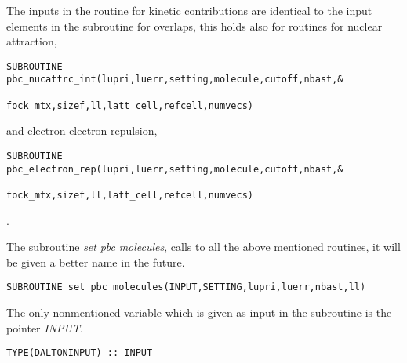\documentclass[12pt,a4paper,english]{article}
\begin{document}
The inputs in the routine for kinetic contributions are identical to the input elements in the subroutine for overlaps, this holds also for routines for nuclear attraction,
\begin{verbatim}
SUBROUTINE pbc_nucattrc_int(lupri,luerr,setting,molecule,cutoff,nbast,&
                            fock_mtx,sizef,ll,latt_cell,refcell,numvecs)
\end{verbatim}
and electron-electron repulsion,
\begin{verbatim}
SUBROUTINE pbc_electron_rep(lupri,luerr,setting,molecule,cutoff,nbast,&
                            fock_mtx,sizef,ll,latt_cell,refcell,numvecs)
\end{verbatim}.

The subroutine \emph{set$\_$pbc$\_$molecules}, calls to all the above mentioned routines, it will be given a better name in the future.

\begin{verbatim}
SUBROUTINE set_pbc_molecules(INPUT,SETTING,lupri,luerr,nbast,ll)
\end{verbatim}
The only nonmentioned variable which is given as input in the subroutine is the pointer \emph{INPUT}.
\begin{verbatim}
TYPE(DALTONINPUT) :: INPUT
\end{verbatim}
\end{document}
